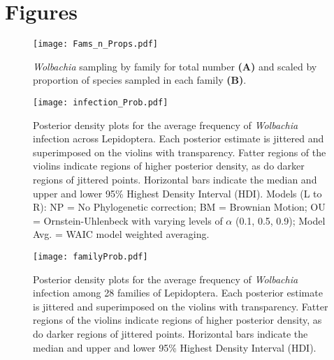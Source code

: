 \documentclass{frontiersSCNS}
\begin{document}

\section*{Figures}

\begin{figure}[h!]
\begin{center}
\texttt{[image: Fams\_n\_Props.pdf]}%
\end{center}
\caption{\textit{Wolbachia} sampling by family for total number \textbf{(A)} and scaled by proportion of species sampled in each family \textbf{(B)}.}
\label{histograms}
\end{figure}

\newpage

\begin{figure}[h!]
  \begin{center}
    \texttt{[image: infection\_Prob.pdf]}
    \caption{Posterior density plots for the average frequency of \textit{Wolbachia} infection across Lepidoptera. Each posterior estimate is jittered and superimposed on the violins with transparency. Fatter regions of the  violins indicate regions of higher posterior density, as do darker regions of jittered points. Horizontal bars indicate the median and upper and lower 95\% Highest Density Interval (HDI).  Models (L to R): NP = No Phylogenetic correction; BM = Brownian Motion; OU = Ornstein-Uhlenbeck with varying levels of $\alpha$ (0.1, 0.5, 0.9); Model Avg. = WAIC model weighted averaging.}
 \label{grand}
  \end{center}
\end{figure}

\newpage 

\begin{figure}[h!]
  \begin{center}
    \texttt{[image: familyProb.pdf]}
    \caption{Posterior density plots for the average frequency of \textit{Wolbachia} infection among 28 families of Lepidoptera. Each posterior estimate is jittered and superimposed on the violins with transparency. Fatter regions of the  violins indicate regions of higher posterior density, as do darker regions of jittered points. Horizontal bars indicate the median and upper and lower 95\% Highest Density Interval (HDI).}
 \label{familyplot}
  \end{center}
\end{figure}
\newpage

\end{document}
